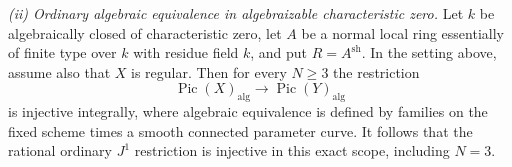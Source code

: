 \emph{(ii) Ordinary algebraic equivalence in
algebraizable characteristic zero.}
Let $k$ be algebraically closed of characteristic
zero, let $A$ be a normal local ring essentially
of finite type over $k$ with residue field $k$,
and put $R=A^{\mathrm{sh}}$. In the setting above,
assume also that $X$ is regular. Then for every
$N\ge3$ the restriction
\begin{equation}\label{eq:C3-ordinary-alg-N3}
          \operatorname{Pic}(X)_{\mathrm{alg}}
                  \longrightarrow\operatorname{Pic}(Y)_{\mathrm{alg}}
\end{equation}
is injective integrally, where algebraic equivalence
is defined by families on the fixed scheme times
a smooth connected parameter curve. It follows
that the rational ordinary $J^1$ restriction is
injective in this exact scope, including $N=3$.

